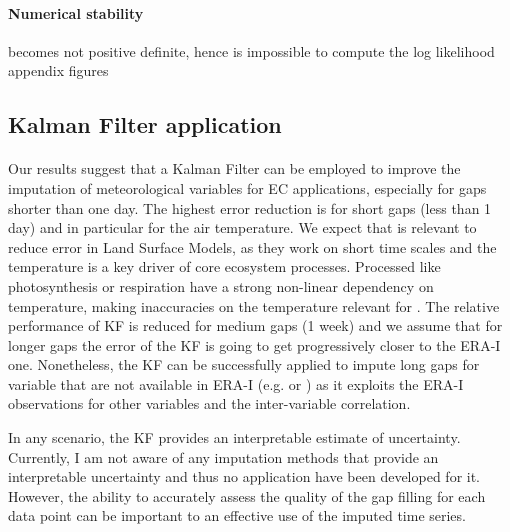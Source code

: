 \documentclass{article}
\let\Oldsubsection\subsection
\renewcommand{\subsection}{\FloatBarrier\Oldsubsection}
\begin{document}
\paragraph{Numerical stability} becomes not positive definite, hence is impossible to compute the log likelihood
appendix figures

\subsection{Kalman Filter application}

\paragraph{} Our results suggest that a Kalman Filter can be employed to improve the imputation of meteorological variables for EC applications, especially for gaps shorter than one day. 
The highest error reduction is for short gaps (less than 1 day) and  in particular for the air temperature. We expect that is relevant to reduce error in Land Surface Models, as they work on short time scales and the temperature is a key driver of core ecosystem processes. Processed like photosynthesis or respiration have a strong non-linear dependency on temperature, making inaccuracies on the temperature relevant for  \cite{bonan_climate_2019-2}.
The relative performance of KF is reduced for medium gaps (1 week) and we assume that for longer gaps the error of the KF is going to get progressively closer to the ERA-I one. Nonetheless, the KF can be successfully applied to impute long gaps for variable that are not available in ERA-I (e.g.  or ) as it exploits the ERA-I observations for other variables and the inter-variable correlation.

In any scenario, the KF provides an interpretable estimate of uncertainty. Currently, I am not aware of any imputation methods that provide an interpretable uncertainty and thus no application have been developed for it. However, the ability to accurately assess the quality of the gap filling for each data point can be important to an effective use of the imputed time series.
\end{document}
